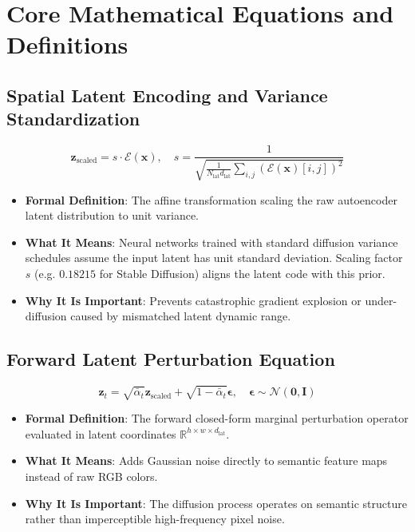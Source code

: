 \documentclass[11pt,a4paper]{article}
\theoremstyle{definition}
\begin{document}
\section{Core Mathematical Equations and Definitions}

\subsection{Spatial Latent Encoding and Variance Standardization}
{\boldmath
\begin{equation}
\mathbf{z}_{\text{scaled}} = s \cdot \mathcal{E}(\mathbf{x}), \quad s = \frac{1}{\sqrt{\frac{1}{N_{\text{lat}} d_{\text{lat}}} \sum_{i, j} (\mathcal{E}(\mathbf{x})[i, j])^2}}
\end{equation}
}
\begin{itemize}
    \item \textbf{Formal Definition}: The affine transformation scaling the raw autoencoder latent distribution to unit variance.
    \item \textbf{What It Means}: Neural networks trained with standard diffusion variance schedules assume the input latent has unit standard deviation. Scaling factor $s$ (e.g. $0.18215$ for Stable Diffusion) aligns the latent code with this prior.
    \item \textbf{Why It Is Important}: Prevents catastrophic gradient explosion or under-diffusion caused by mismatched latent dynamic range.
\end{itemize}

\subsection{Forward Latent Perturbation Equation}
{\boldmath
\begin{equation}
\mathbf{z}_t = \sqrt{\bar{\alpha}_t} \mathbf{z}_{\text{scaled}} + \sqrt{1 - \bar{\alpha}_t} \boldsymbol{\epsilon}, \quad \boldsymbol{\epsilon} \sim \mathcal{N}(\mathbf{0}, \mathbf{I})
\end{equation}
}
\begin{itemize}
    \item \textbf{Formal Definition}: The forward closed-form marginal perturbation operator evaluated in latent coordinates $\mathbb{R}^{h \times w \times d_{\text{lat}}}$.
    \item \textbf{What It Means}: Adds Gaussian noise directly to semantic feature maps instead of raw RGB colors.
    \item \textbf{Why It Is Important}: The diffusion process operates on semantic structure rather than imperceptible high-frequency pixel noise.
\end{itemize}
\end{document}
